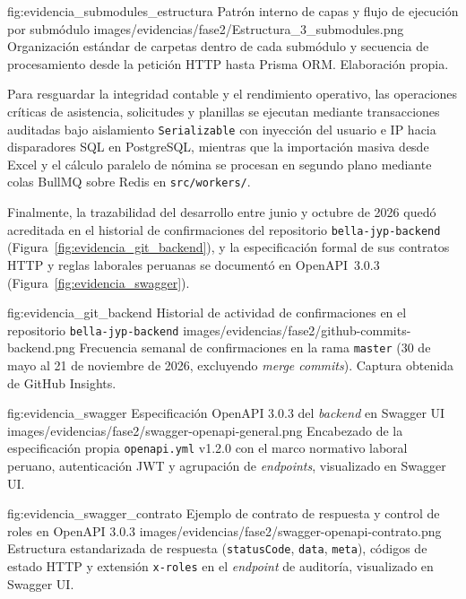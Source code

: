 \figuraEnTexto
    {fig:evidencia_submodules_estructura}
    {Patrón interno de capas y flujo de ejecución por submódulo}
    {images/evidencias/fase2/Estructura_3_submodules.png}
    {Organización estándar de carpetas dentro de cada submódulo y secuencia de procesamiento desde la petición HTTP hasta Prisma ORM. Elaboración propia.}

Para resguardar la integridad contable y el rendimiento operativo, 
las operaciones críticas de asistencia, solicitudes y planillas se ejecutan mediante transacciones auditadas bajo aislamiento 
\texttt{Serializable} con inyección del usuario e IP hacia disparadores SQL en PostgreSQL, 
mientras que la importación masiva desde Excel y el cálculo paralelo de nómina se procesan en segundo plano mediante colas 
BullMQ sobre Redis en \texttt{src/workers/}.

Finalmente, la trazabilidad del desarrollo entre junio y octubre de 
2026 quedó acreditada en el historial de confirmaciones del repositorio \texttt{bella-jyp-backend} (Figura~\ref{fig:evidencia_git_backend}), 
y la especificación formal de sus contratos HTTP y reglas laborales peruanas se documentó en OpenAPI~3.0.3 (Figura~\ref{fig:evidencia_swagger}).

\figuraEnTexto
    {fig:evidencia_git_backend}
    {Historial de actividad de confirmaciones en el repositorio \texttt{bella-jyp-backend}}
    {images/evidencias/fase2/github-commits-backend.png}
    {Frecuencia semanal de confirmaciones en la rama \texttt{master} (30 de mayo al 21 de noviembre de 2026, 
    excluyendo \textit{merge commits}). Captura obtenida de GitHub Insights.}

\figuraEnTexto
    {fig:evidencia_swagger}
    {Especificación OpenAPI 3.0.3 del \textit{backend} en Swagger UI}
    {images/evidencias/fase2/swagger-openapi-general.png}
    {Encabezado de la especificación propia \texttt{openapi.yml} v1.2.0 con el marco normativo laboral peruano, 
    autenticación JWT y agrupación de \textit{endpoints}, visualizado en Swagger UI.}

\figuraEnTexto
    {fig:evidencia_swagger_contrato}
    {Ejemplo de contrato de respuesta y control de roles en OpenAPI 3.0.3}
    {images/evidencias/fase2/swagger-openapi-contrato.png}
    {Estructura estandarizada de respuesta (\texttt{statusCode}, \texttt{data}, \texttt{meta}), códigos de estado HTTP y extensión \texttt{x-roles} en el \textit{endpoint} de auditoría, visualizado en Swagger UI.}

